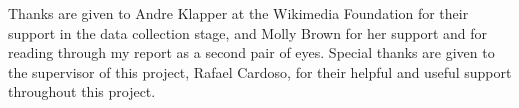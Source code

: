 Thanks are given to Andre Klapper at the Wikimedia Foundation for their support in the data collection stage, and Molly Brown for her support and for reading through my report as a second pair of eyes. Special thanks are given to the supervisor of this project, Rafael Cardoso, for their helpful and useful support throughout this project.